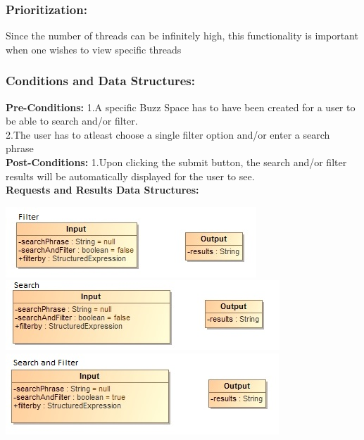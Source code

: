 \documentclass[a4paper,11pt]{article}
\begin{document}
\subsubsection{Prioritization:} Since the number of threads can be infinitely high, this functionality is important when one wishes to view specific threads\\
\subsubsection{Conditions and Data Structures:}
\textbf{Pre-Conditions:}
1.A specific Buzz Space has to have been created for a user to be able to search and/or filter.\\
2.The user has to atleast choose a single filter option and/or enter a search phrase\\
\textbf{Post-Conditions:}
1.Upon clicking the submit button, the search and/or filter results will be automatically displayed for the user to see.\\
\textbf{Requests and Results Data Structures:}
\begin{center}
\includegraphics[width=0.5\linewidth]{Images/SearchAndFilter/Filter_input_output}\\
\includegraphics[width=0.5\linewidth]{Images/SearchAndFilter/Search_Input_output}\\
\includegraphics[width=0.5\linewidth]{Images/SearchAndFilter/SearchAndFilter_input_output}\\
\end{center}
\end{document}
